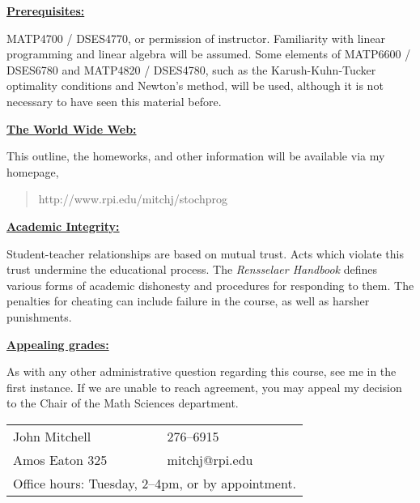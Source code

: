{\raggedright   {\bf \underline{Prerequisites:}}  }

\noindent
MATP4700 / DSES4770, or permission of instructor.
Familiarity with linear programming and linear algebra will be assumed.
Some elements of MATP6600 / DSES6780 and MATP4820 / DSES4780,
such as the Karush-Kuhn-Tucker
optimality conditions and Newton's
method, will be used, although it is not necessary to have seen this material
before.  \\

{\raggedright  {\bf \underline{The World Wide Web:}}  }

\noindent
This outline, the homeworks, and other information
will be available via my homepage,
\begin{quote}
  http://www.rpi.edu/\til mitchj/stochprog
\end{quote}

{\raggedright   {\bf \underline{Academic Integrity:}}  }

\noindent
Student-teacher relationships are based on mutual trust.
Acts which violate this trust undermine the educational process.
The {\em Rensselaer Handbook} defines various forms of academic
dishonesty and procedures for responding to them.
The penalties for cheating can include failure in the course,
as well as harsher punishments. \\


{\raggedright   {\bf \underline{Appealing grades:}} }

\noindent
As with any other administrative question regarding this course,
see me in the first instance.  If we are unable to reach agreement,
you may appeal my decision to the Chair of the Math Sciences department. \\


\vspace{\fill}


\begin{tabular}{@{\hspace{2in}}ll}
   John Mitchell    &  276--6915 \\
   Amos Eaton 325   &  mitchj@rpi.edu  \\
   \multicolumn{2}{l}{{\hspace{1.92in}}Office hours:
Tuesday, 2--4pm, or by appointment.}
\end{tabular}







